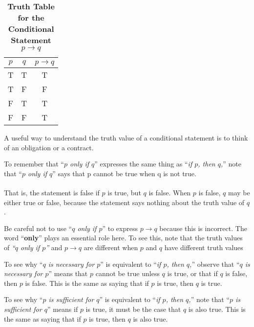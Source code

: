 \begin{table}[h!]
\centering
\caption*{\textbf{Truth Table for the Conditional Statement $p \rightarrow q$}}
\begin{tabular}{|c|c!{\vrule width 1.5pt}c|}
\hline
{}
\textbf{$p$} & \textbf{$q$} & \textbf{$p \rightarrow q$} \\
\hline
T & T & T \\
T & F & F \\
F & T & T \\
F & F & T \\
\hline
\end{tabular}
\end{table}

\begin{tcolorbox}[colback=white, colframe=gray!60, title=Remark 3]
A useful way to understand the truth value of a conditional statement is to think of an obligation
or a contract. 
\end{tcolorbox}
\begin{tcolorbox}[colback=white, colframe=gray!60, title=Remark 4]
To remember that “\textit{$p$ only if $q$}” expresses the
same thing as “\textit{if $p$, then $q$,}” note that “\textit{$p$ only if $q$}” says that p cannot be true when q is not true. \\ \\
That is, the statement is false if $p$ is true, but $q$ is false. When $p$ is false, $q$ may be either true or
false, because the statement says nothing about the truth value of $q$.
\end{tcolorbox}
\begin{tcolorbox}[colback=white, colframe=gray!60, title=Remark 5]
Be careful not to use “\textit{$q$ only if $p$}” to express $p\rightarrow q$ because this is incorrect. The word
“\textbf{only}” plays an essential role here. To see this, note that the truth values of \textit{“$q$ only if $p$”} and $p \rightarrow q$ are different when $p$ and $q$ have different truth values
\end{tcolorbox}
\begin{tcolorbox}[colback=white, colframe=gray!60, title=Remark 6]
To see why “\textit{$q$ is necessary for $p$}”
is equivalent to “\textit{if $p$, then $q$,}” observe that “\textit{$q$ is necessary for $p$}” means that $p$ cannot be true
unless $q$ is true, or that if $q$ is false, then $p$ is false. This is the same as saying that if $p$ is true, then $q$ is true.
\end{tcolorbox}
\begin{tcolorbox}[colback=white, colframe=gray!60, title=Remark 7]
To see why “\textit{$p$ is sufficient for $q$}” is equivalent to “\textit{if $p$, then $q$,}” note that “\textit{$p$ is
sufficient for $q$}” means if $p$ is true, it must be the case that $q$ is also true. This is the same as saying that if $p$ is true, then $q$ is also true.
\end{tcolorbox}

